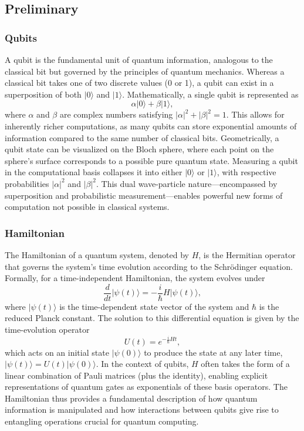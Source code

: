 \documentclass[%
 reprint,
 amsmath,amssymb,
 aps,
]{revtex4-2}
\begin{document}
\subsection{Preliminary}\label{Append:per}
\subsubsection{Qubits}
A qubit is the fundamental unit of quantum information, analogous to the classical bit but governed by the principles of quantum mechanics. Whereas a classical bit takes one of two discrete values (0 or 1), a qubit can exist in a superposition of both $\lvert 0 \rangle$ and $\lvert 1 \rangle$. Mathematically, a single qubit is represented as 
\[
\alpha \lvert 0 \rangle + \beta \lvert 1 \rangle,
\]
where $\alpha$ and $\beta$ are complex numbers satisfying $|\alpha|^2 + |\beta|^2 = 1$. This allows for inherently richer computations, as many qubits can store exponential amounts of information compared to the same number of classical bits. Geometrically, a qubit state can be visualized on the Bloch sphere, where each point on the sphere's surface corresponds to a possible pure quantum state. Measuring a qubit in the computational basis collapses it into either $\lvert 0 \rangle$ or $\lvert 1 \rangle$, with respective probabilities $|\alpha|^2$ and $|\beta|^2$. This dual wave-particle nature---encompassed by superposition and probabilistic measurement---enables powerful new forms of computation not possible in classical systems.

\subsubsection{Hamiltonian}
The Hamiltonian of a quantum system, denoted by $H$, is the Hermitian operator that governs the system's time evolution according to the Schr\"odinger equation. Formally, for a time-independent Hamiltonian, the system evolves under
\[
\frac{d}{dt}\lvert \psi(t)\rangle = -\frac{i}{\hbar} H \lvert \psi(t)\rangle,
\]
where $\lvert \psi(t)\rangle$ is the time-dependent state vector of the system and $\hbar$ is the reduced Planck constant. The solution to this differential equation is given by the time-evolution operator 
\[
U(t) = e^{-\tfrac{i}{\hbar} H t},
\]
which acts on an initial state $\lvert \psi(0)\rangle$ to produce the state at any later time, $\lvert \psi(t)\rangle = U(t) \lvert \psi(0)\rangle$. In the context of qubits, $H$ often takes the form of a linear combination of Pauli matrices (plus the identity), enabling explicit representations of quantum gates as exponentials of these basis operators. The Hamiltonian thus provides a fundamental description of how quantum information is manipulated and how interactions between qubits give rise to entangling operations crucial for quantum computing. 
\end{document}
